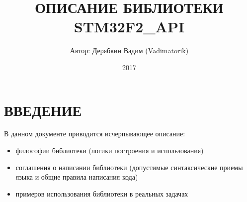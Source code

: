 \documentclass[a4paper, 12pt]{report}		%
\begin{document}
	\title {ОПИСАНИЕ БИБЛИОТЕКИ STM32F2\_API}
	\author {Автор: Дерябкин Вадим (Vadimatorik)}
	\date {2017}
	\maketitle
	
	\chapter{ВВЕДЕНИЕ}
	В данном документе приводится исчерпывающее описание:
	\begin{itemize}
		\item философии библиотеки (логики построения и использования)
		\item соглашения о написании библиотеки (допустимые синтаксические приемы языка и общие правила написания кода)
		\item примеров использования библиотеки в реальных задачах
	\end{itemize}

	\tableofcontents
	\clearpage							%
	
\end{document}
